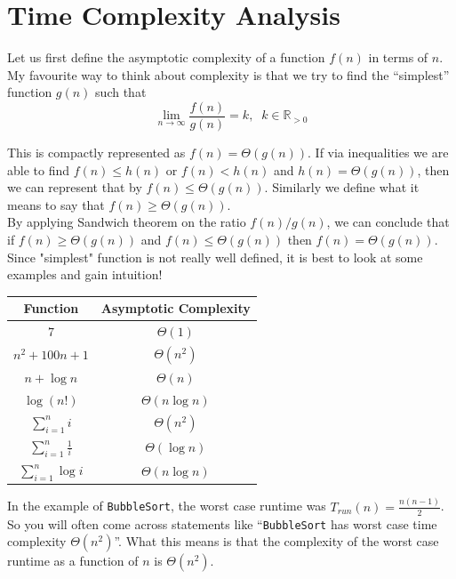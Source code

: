 \section{Time Complexity Analysis}

Let us first define the asymptotic complexity of a function \(f(n)\) in terms of \(n\). My favourite way to 
think about complexity is that we try to find the ``simplest'' function \(g(n)\) such that
\[
\lim_{n\to\infty}\frac{f(n)}{g(n)}=k, \;\;
k\in\mathbb{R}_{>0}
\]

This is compactly represented as $f(n)=\Theta(g(n))$. If via inequalities we 
are able to find $f(n) \le h(n)$ or $f(n) < h(n)$ and $h(n)=\Theta(g(n))$, then we can represent that by $f(n) \le \Theta(g(n))$. 
Similarly we define what it means to say that $f(n) \ge \Theta(g(n))$.\\


\noindent By applying Sandwich theorem on the ratio $f(n)/g(n)$, we can conclude that if $f(n) \ge \Theta(g(n))$ 
and $f(n) \le \Theta(g(n))$ then $f(n)=\Theta(g(n))$.\\


\noindent Since "simplest" function is not really well defined, it is best 
to look at some examples and gain intuition!
\begin{center}
\begin{tabular}{|c|c|}
\hline
Function & Asymptotic Complexity \\
\hline
$7$ & $\Theta(1)$ \\
\hline
$n^2+100n+1$ & $\Theta(n^2)$ \\
\hline
$n+\log n$ & $\Theta(n)$ \\
\hline
$\log(n!)$ & $\Theta(n\log n)$ \\
\hline
$\displaystyle\sum_{i=1}^{n} i$ & $\Theta(n^2)$ \\
\hline
$\displaystyle\sum_{i=1}^{n} \frac1i$ & $\Theta(\log n)$ \\
\hline
$\displaystyle\sum_{i=1}^{n} \log i$ & $\Theta(n\log n)$ \\
\hline
\end{tabular}
\end{center}

\noindent In the example of \texttt{BubbleSort}, the worst case runtime was $T_{run}(n)=\frac{n(n-1)}{2}$. So you 
will often come across statements like ``\texttt{BubbleSort} has worst case time complexity $\Theta(n^2)$''. What 
this means is that the complexity of the worst case runtime as a function of $n$ is $\Theta(n^2)$.\\

